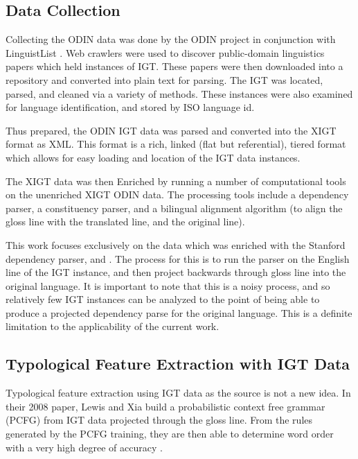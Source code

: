 \documentclass[]{article}
\begin{document}
\subsection{Data Collection}
Collecting the ODIN data was done by the ODIN project in conjunction with LinguistList \cite{lewis2006odin}.  Web crawlers were used to discover public-domain linguistics papers which held instances of IGT.  These papers were then downloaded into a repository and converted into plain text for parsing.  The IGT was located, parsed, and cleaned via a variety of methods.  These instances were also examined for language identification, and stored by ISO language id.  \par

Thus prepared, the ODIN IGT data was parsed and converted into the XIGT format \cite{goodman2015xigt} as XML.  This format is a rich, linked (flat but referential), tiered format which allows for easy loading and location of the IGT data instances.\par

The XIGT data was then Enriched by running a number of computational tools on the unenriched XIGT ODIN data. The processing tools include a dependency parser, a constituency parser, and a bilingual alignment algorithm (to align the gloss line with the translated line, and the original line). \par

This work focuses exclusively on the data which was enriched with the Stanford dependency parser, \cite{xia2007multilingual} and \cite{de2006generating}.  The process for this is to run the parser on the English line of the IGT instance, and then project backwards through gloss line into the original language.  It is important to note that this is a noisy process, and so relatively few IGT instances can be analyzed to the point of being able to produce a projected dependency parse for the original language.  This is a definite limitation to the applicability of the current work.\par

\subsection{Typological Feature Extraction with IGT Data}
Typological feature extraction using IGT data as the source is not a new idea.  In their 2008 paper, Lewis and Xia build a probabilistic context free grammar (PCFG) from IGT data projected through the gloss line.  From the rules generated by the PCFG training, they are then able to determine word order with a very high degree of accuracy \cite{lewis2008automatically}.  \par
\end{document}
